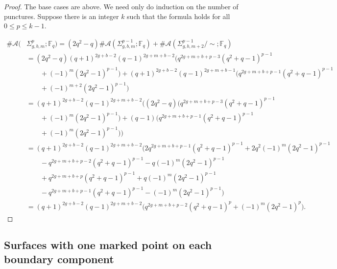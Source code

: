 \documentclass[reqno,12pt]{amsart}
\theoremstyle{definition}
\theoremstyle{remark}
\theoremstyle{remark}
\numberwithin{equation}{section}
\begin{document}
\begin{proof}
    The base cases are above. We need only do induction on the number of punctures. Suppose there is an integer $k$ such that the formula holds for all $0 \leq p \leq k-1$. 
    
    \begin{align*}
        \#\mathcal{A}(&\Sigma_{g,b,m}^p; \mathbb{F}_q) = (2q^2-q) \#\mathcal{A}(\Sigma_{g,b,m}^{p-1}; \mathbb{F}_q) + \#\mathcal{A}(\Sigma_{g,b,m+2}^{p-1}/\!\sim; \mathbb{F}_q) \\
        &= (2q^2 - q)(q+1)^{2g+b-2} (q-1)^{2g+m+b-2} \big( q^{2g+m+b+p-3} (q^2+q-1)^{p-1}  \\ &\quad\quad + (-1)^m (2q^2-1)^{p-1} \big) + (q+1)^{2g+b-2} (q-1)^{2g+m+b-1} \big( q^{2g+m+b+p-1} (q^2+q-1)^{p-1}  \\ &\quad\quad  + (-1)^{m+2} (2q^2-1)^{p-1} \big) \\
        &= (q+1)^{2g+b-2} (q-1)^{2g+m+b-2} \big( (2q^2 - q)\big(q^{2g+m+b+p-3} (q^2+q-1)^{p-1}  \\ &\quad\quad  + (-1)^m (2q^2-1)^{p-1}\big) + (q-1) \big(q^{2g+m+b+p-1} (q^2+q-1)^{p-1}  \\ &\quad\quad   + (-1)^m (2q^2-1)^{p-1} \big)\big) \\
        &= (q+1)^{2g+b-2} (q-1)^{2g+m+b-2} \big( 2q^{2g+m+b+p-1} (q^2+q-1)^{p-1} + 2q^2(-1)^m (2q^2-1)^{p-1}  \\ &\quad\quad - q^{2g+m+b+p-2} (q^2+q-1)^{p-1} -q (-1)^m (2q^2-1)^{p-1} \\ &\quad\quad + q^{2g+m+b+p} (q^2+q-1)^{p-1} + q(-1)^m (2q^2-1)^{p-1} \\ &\quad\quad  - q^{2g+m+b+p-1} (q^2+q-1)^{p-1} - (-1)^m (2q^2-1)^{p-1} \big) \\
        &= (q+1)^{2g+b-2} (q-1)^{2g+m+b-2} \big( q^{2g+m+b+p-2} (q^2+q-1)^{p} + (-1)^m (2q^2-1)^{p}\big).
    \end{align*}
\end{proof}

\subsection{Surfaces with one marked point on each boundary component}
\end{document}
